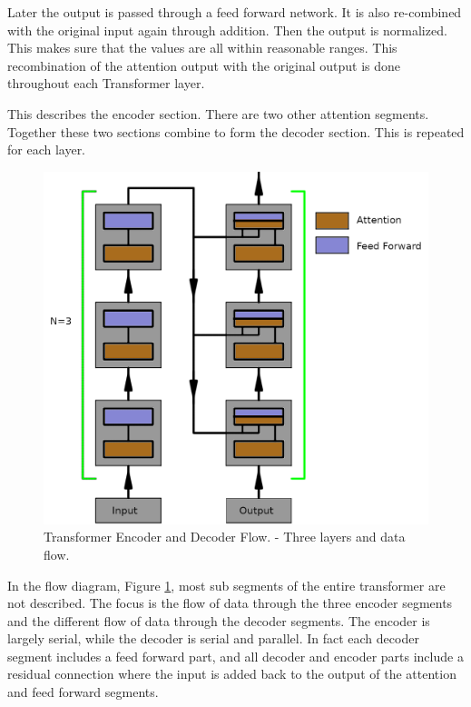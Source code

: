 Later the output is passed through a feed forward network. It is also re-combined with the original input again through addition. Then the output is normalized. This makes sure that the values are all within reasonable ranges. This recombination of the attention output with the original output is done throughout each Transformer layer.

This describes the encoder section. There are two other attention segments. Together these two sections combine to form the decoder section. This is repeated for each layer.

\begin{figure}[H]
	\begin{center}
		
		
		\includegraphics[scale=1.0]{diagram-flow1}
	\end{center}
	\caption[Transformer Encoder and Decoder Flow]{Transformer Encoder and Decoder Flow. - Three layers and data flow.}
	\label{diagram-flow1}
	
\end{figure}

In the flow diagram, Figure \ref{diagram-flow1}, most sub segments of the entire transformer are not described. The focus is the flow of data through the three encoder segments and the different flow of data through the decoder segments. The encoder is largely serial, while the decoder is serial and parallel. In fact each decoder segment includes a feed forward part, and all decoder and encoder parts include a residual connection where the input is added back to the output of the attention and feed forward segments.

